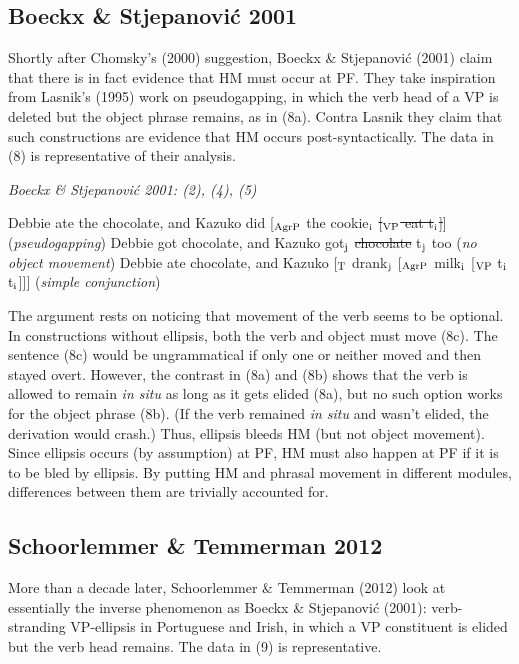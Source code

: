 \documentclass[]{ling-200b-2}
\newcommand*{\textsub}[1]{\ensuremath{_\textrm{{\scriptsize #1}}}}
\begin{document}
\subsection{Boeckx \& Stjepanović 2001}

Shortly after Chomsky's (2000) suggestion, Boeckx \& Stjepanović (2001) claim that there is in fact evidence that HM must occur at PF. They take inspiration from Lasnik's (1995) work on pseudogapping, in which the verb head of a VP is deleted but the object phrase remains, as in (8a). Contra Lasnik they claim that such constructions are evidence that HM occurs post-syntactically. The data in (8) is representative of their analysis.

\pex \textit{Boeckx \& Stjepanović 2001: (2), (4), (5)}

\a Debbie ate the chocolate, and Kazuko did [\textsub{AgrP} the cookie\textsub{i} \sout{[\textsub{VP} eat t\textsub{i}]}] \hfill (\textit{pseudogapping})
\a *Debbie got chocolate, and Kazuko got\textsub{j} \sout{chocolate} t\textsub{j} too \hfill (\textit{no object movement})
\a Debbie ate chocolate, and Kazuko [\textsub{T} drank\textsub{j} [\textsub{AgrP} milk\textsub{i} [\textsub{VP} t\textsub{i} t\textsub{i}]]] \hfill (\textit{simple conjunction})
\xe

The argument rests on noticing that movement of the verb seems to be optional. In constructions without ellipsis, both the verb and object must move (8c). The sentence (8c) would be ungrammatical if only one or neither moved and then stayed overt. However, the contrast in (8a) and (8b) shows that the verb is allowed to remain \textit{in situ} as long as it gets elided (8a), but no such option works for the object phrase (8b). (If the verb remained \textit{in situ} and wasn't elided, the derivation would crash.) Thus, ellipsis bleeds HM (but not object movement). Since ellipsis occurs (by assumption) at PF, HM must also happen at PF if it is to be bled by ellipsis. By putting HM and phrasal movement in different modules, differences between them are trivially accounted for.

\subsection{Schoorlemmer \& Temmerman 2012}

More than a decade later, Schoorlemmer \& Temmerman (2012) look at essentially the inverse phenomenon as Boeckx \& Stjepanovi\'{c} (2001): verb-stranding VP-ellipsis in Portuguese and Irish, in which a VP constituent is elided but the verb head remains. The data in (9) is representative.
\end{document}
